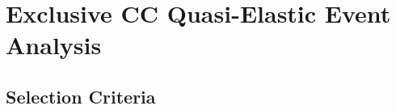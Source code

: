 \section{Exclusive CC Quasi-Elastic Event Analysis}
\label{sec:ExclusiveAnalysis}
\subsection{Selection Criteria}

